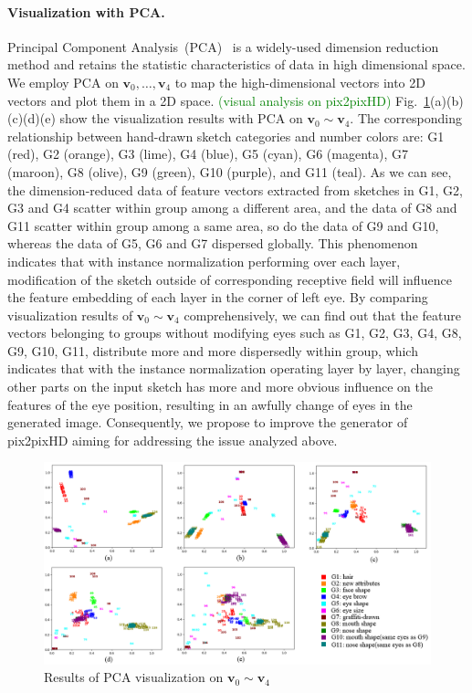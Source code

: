 \documentclass[10pt,twocolumn,letterpaper]{article}
\newcommand{\amend}[1]{\textcolor{green}{(#1)}}
\begin{document}
\paragraph{Visualization with PCA.} Principal Component Analysis~(PCA)~\cite{pca} is a widely-used dimension reduction method and retains the statistic characteristics of data in high dimensional space. 
We employ PCA on $\boldsymbol{v}_0,\ldots, \boldsymbol{v}_4$ to map the high-dimensional vectors into 2D vectors and plot them in a 2D space.
\amend{visual analysis on pix2pixHD}
Fig.~\ref{fig:pca_0}(a)(b)(c)(d)(e) show the visualization results with PCA on $\boldsymbol{v}_0\sim\boldsymbol{v}_4$. 
The corresponding relationship between hand-drawn sketch categories and number colors are: G1 (red), G2 (orange), G3 (lime), G4 (blue), G5 (cyan), G6 (magenta), G7 (maroon), G8 (olive), G9 (green), G10 (purple), and G11 (teal).
As we can see, the dimension-reduced data of feature vectors extracted from sketches in G1, G2, G3 and G4 scatter within group among a different area, and the data of G8 and G11 scatter within group among a same area, so do the data of G9 and G10, whereas the data of G5, G6 and G7 dispersed globally.
This phenomenon indicates that with instance normalization performing over each layer, modification of the sketch outside of corresponding receptive field will influence the feature embedding of each layer in the corner of left eye. 
By comparing visualization results of $\boldsymbol{v}_0\sim\boldsymbol{v}_4$ comprehensively, we can find out that the feature vectors belonging to groups without modifying eyes such as G1, G2, G3, G4, G8, G9, G10, G11, distribute more and more dispersedly within group, which indicates that with the instance normalization operating layer by layer, changing other parts on the input sketch has more and more obvious influence on the features of the eye position, resulting in an awfully change of eyes in the generated image.
Consequently, we propose to improve the generator of pix2pixHD aiming for addressing the issue analyzed above. 

\begin{figure}[htb]
	\centering
	\includegraphics[width=0.9 \textwidth]{pca_0.png}
	\caption{Results of PCA visualization on $\boldsymbol{v}_0\sim\boldsymbol{v}_4$}
	\label{fig:pca_0}
\end{figure}      
\end{document}
